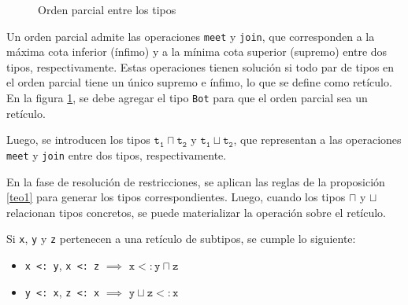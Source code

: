\begin{figure}[ht]
  \centering
  \caption{Orden parcial entre los tipos}
  \label{subt1}
\end{figure}

Un orden parcial admite las operaciones \texttt{meet} y \texttt{join}, que corresponden a la máxima cota inferior (ínfimo) y a la mínima cota superior (supremo) entre dos tipos, respectivamente. Estas operaciones tienen solución si todo par de tipos en el orden parcial tiene un único supremo e ínfimo, lo que se define como retículo. En la figura \ref{subt1}, se debe agregar el tipo \texttt{Bot} para que el orden parcial sea un retículo.

Luego, se introducen los tipos $\mathtt{t_1 \sqcap t_2}$ y $\mathtt{t_1 \sqcup t_2}$, que representan a las operaciones \texttt{meet} y \texttt{join} entre dos tipos, respectivamente.

En la fase de resolución de restricciones, se aplican las reglas de la proposición \ref{teo1} para generar los tipos correspondientes. Luego, cuando los tipos $\sqcap$ y $\sqcup$ relacionan tipos concretos, se puede materializar la operación sobre el retículo.


\begin{prop} \label{teo1} \normalfont Si \texttt{x}, \texttt{y} y \texttt{z} pertenecen a una retículo de subtipos, se cumple lo siguiente: \\
  \begin{itemize}
    \item \texttt{x <: y}, \texttt{x <: z} $\implies$ $\mathtt{x <: y \sqcap z}$
    \item \texttt{y <: x}, \texttt{z <: x} $\implies$ $\mathtt{y \sqcup z <: x}$
  \end{itemize}
\end{prop}

